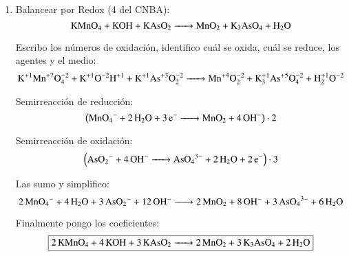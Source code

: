 \begin{enumerate}
\item
Balancear por Redox (4 del CNBA):
$$\ce{
KMnO4 + KOH + KAsO2 ->
MnO2 + K3AsO4 + H2O
}$$

Escribo los números de oxidación, identifico cuál se oxida, cuál se reduce, los agentes y el medio:
\[\ce{
K^{+1}Mn^{+7}O^{-2}4 + K^{+1}O^{-2}H^{+1} + K^{+1}As^{+3}O^{-2}2 ->
Mn^{+4}O^{-2}2 + K^{+1}3As^{+5}O^{-2}4 + H^{+1}2O^{-2}
}\]

\begin{multicols}{2}
Semirreacción de reducción:
$$\left(\ce{
MnO4^- + 2H2O + 3e^- ->
MnO2 + 4OH^-
}\right)\cdot 2$$

Semirreacción de oxidación:
$$\left(\ce{
AsO2^- + 4OH^- ->
AsO_4^{3-} + 2H2O + 2e^-
}\right)\cdot 3$$
\end{multicols}

Las sumo y simplifico:
$$\ce{
2MnO4^- + 4 H2O + 3AsO2^- + 12 OH^- ->
2MnO2 + 8OH^- + 3 AsO4^{3-} + 6H2O
}$$

Finalmente pongo los coeficientes:
$$\fbox{\ce{
2KMnO4 + 4KOH + 3KAsO2 ->
2MnO2 + 3K3AsO4 + 2H2O
}}$$
\end{enumerate}
